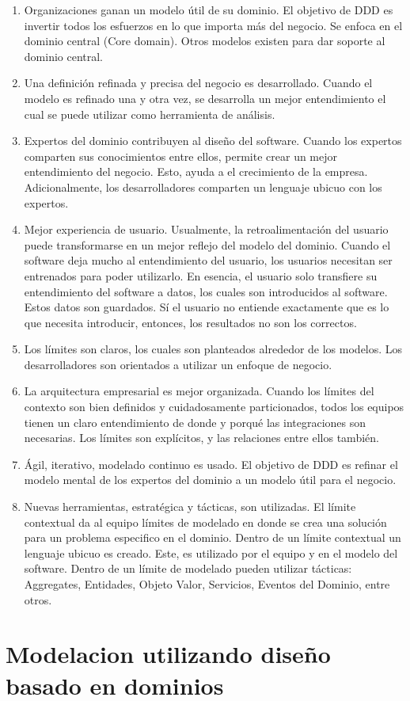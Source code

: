 \documentclass[12pt,twoside]{reedthesis}
\theoremstyle{definition}
\theoremstyle{definition}
\theoremstyle{definition}
\theoremstyle{remark}
\begin{document}
\begin{enumerate}
\def\labelenumi{\arabic{enumi}.}
\item
  Organizaciones ganan un modelo útil de su dominio. El objetivo de DDD
  es invertir todos los esfuerzos en lo que importa más del negocio. Se
  enfoca en el dominio central (Core domain). Otros modelos existen para
  dar soporte al dominio central.
\item
  Una definición refinada y precisa del negocio es desarrollado. Cuando
  el modelo es refinado una y otra vez, se desarrolla un mejor
  entendimiento el cual se puede utilizar como herramienta de análisis.
\item
  Expertos del dominio contribuyen al diseño del software. Cuando los
  expertos comparten sus conocimientos entre ellos, permite crear un
  mejor entendimiento del negocio. Esto, ayuda a el crecimiento de la
  empresa. Adicionalmente, los desarrolladores comparten un lenguaje
  ubicuo con los expertos.
\item
  Mejor experiencia de usuario. Usualmente, la retroalimentación del
  usuario puede transformarse en un mejor reflejo del modelo del
  dominio. Cuando el software deja mucho al entendimiento del usuario,
  los usuarios necesitan ser entrenados para poder utilizarlo. En
  esencia, el usuario solo transfiere su entendimiento del software a
  datos, los cuales son introducidos al software. Estos datos son
  guardados. Sí el usuario no entiende exactamente que es lo que
  necesita introducir, entonces, los resultados no son los correctos.
\item
  Los límites son claros, los cuales son planteados alrededor de los
  modelos. Los desarrolladores son orientados a utilizar un enfoque de
  negocio.
\item
  La arquitectura empresarial es mejor organizada. Cuando los límites
  del contexto son bien definidos y cuidadosamente particionados, todos
  los equipos tienen un claro entendimiento de donde y porqué las
  integraciones son necesarias. Los límites son explícitos, y las
  relaciones entre ellos también.
\item
  Ágil, iterativo, modelado continuo es usado. El objetivo de DDD es
  refinar el modelo mental de los expertos del dominio a un modelo útil
  para el negocio.
\item
  Nuevas herramientas, estratégica y tácticas, son utilizadas. El límite
  contextual da al equipo límites de modelado en donde se crea una
  solución para un problema especifico en el dominio. Dentro de un
  límite contextual un lenguaje ubicuo es creado. Este, es utilizado por
  el equipo y en el modelo del software. Dentro de un límite de modelado
  pueden utilizar tácticas: Aggregates, Entidades, Objeto Valor,
  Servicios, Eventos del Dominio, entre otros.
\end{enumerate}
\hypertarget{modelacion-utilizando-diseno-basado-en-dominios}{%
\chapter{Modelacion utilizando diseño basado en
dominios}\label{modelacion-utilizando-diseno-basado-en-dominios}}
\end{document}
